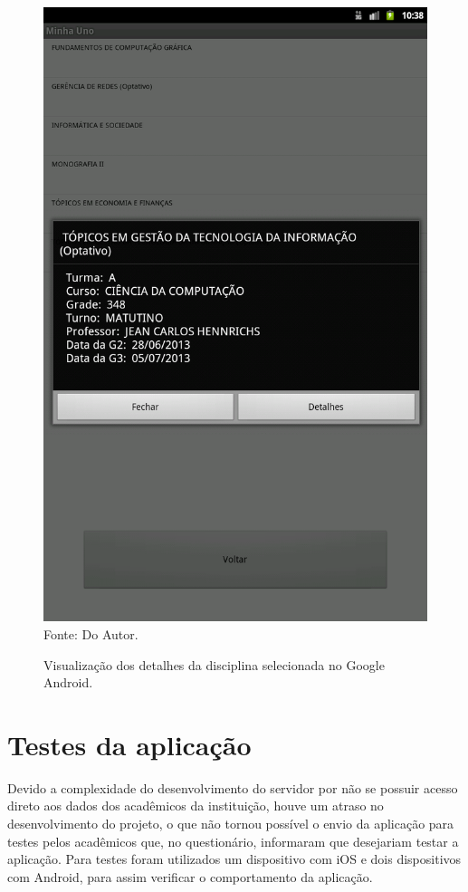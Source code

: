 \begin{figure}[!htb]
     \centering
     \caption[Formulário Horários do Semestre - Google Android]{Visualização dos detalhes da disciplina selecionada no Google Android.}
     \includegraphics[scale=0.22]{imagens/detalhesdisciplinaandroid.png}
     \label{fig:DetalhesDisciplina}
     \\  Fonte: Do Autor.
\end{figure}

\newpage

\section{Testes da aplicação}
Devido a complexidade do desenvolvimento do servidor por não se possuir acesso direto aos dados dos acadêmicos da instituição, houve um atraso no desenvolvimento do projeto, o que não tornou possível o envio da aplicação para testes pelos acadêmicos que, no questionário, informaram que desejariam testar a aplicação. Para testes foram utilizados um dispositivo com iOS e dois dispositivos com Android, para assim verificar o comportamento da aplicação.